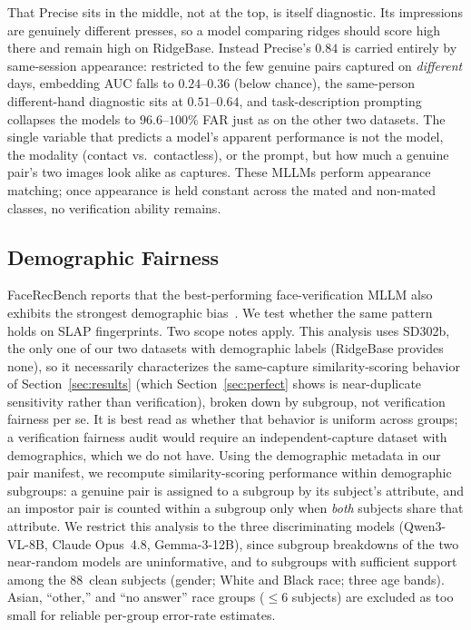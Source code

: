 \documentclass[journal]{IEEEtran}
\begin{document}
That Precise sits in the middle, not at the top, is itself diagnostic. Its
impressions are genuinely different presses, so a model comparing ridges should
score high there and remain high on RidgeBase. Instead Precise's $0.84$ is
carried entirely by same-session appearance: restricted to the few genuine pairs
captured on \emph{different} days, embedding AUC falls to $0.24$--$0.36$ (below
chance), the same-person different-hand diagnostic sits at $0.51$--$0.64$, and
task-description prompting collapses the models to $96.6$--$100\%$ FAR just as on
the other two datasets. The single variable that predicts a model's apparent
performance is not the model, the modality (contact vs.\ contactless), or the
prompt, but how much a genuine pair's two images look alike as captures. These
MLLMs perform appearance matching; once appearance is held constant across the
mated and non-mated classes, no verification ability remains.

\subsection{Demographic Fairness}
\label{sec:fairness}

FaceRecBench reports that the best-performing face-verification MLLM also
exhibits the strongest demographic bias~\cite{facerecbench2025}.
We test whether the same pattern holds on SLAP fingerprints. Two scope notes
apply. This analysis uses SD302b, the only one of our two datasets with
demographic labels (RidgeBase provides none), so it necessarily characterizes
the same-capture similarity-scoring behavior of Section~\ref{sec:results} (which
Section~\ref{sec:perfect} shows is near-duplicate sensitivity rather than
verification), broken down by subgroup, not verification fairness per se. It is
best read as whether that behavior is uniform across groups; a verification
fairness audit would require an independent-capture dataset with demographics,
which we do not have.
Using the demographic metadata in our pair manifest, we recompute
similarity-scoring performance within demographic subgroups: a genuine
pair is assigned to a subgroup by its subject's attribute, and an impostor
pair is counted within a subgroup only when \emph{both} subjects share that
attribute. We restrict this analysis to the three discriminating models
(Qwen3-VL-8B, Claude Opus~4.8, Gemma-3-12B), since subgroup breakdowns of
the two near-random models are uninformative, and to subgroups with
sufficient support among the 88~clean subjects (gender; White and Black
race; three age bands). Asian, ``other,'' and ``no answer'' race groups
($\leq 6$ subjects) are excluded as too small for reliable per-group
error-rate estimates.
\end{document}
